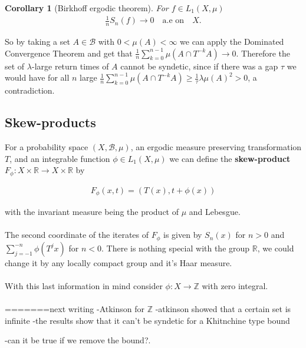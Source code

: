\documentclass{article}
\newtheorem{corollary}{Corollary}[theorem]
\begin{document}
\begin{corollary}[Birkhoff ergodic theorem]
For $f\in L_1(X,\mu)$
\begin{align*}
        \frac{1}{n}S_n(f)\to 0 \quad \text{a.e on} \quad X.
\end{align*}
\end{corollary}

So by taking a set $A\in \mathcal{B}$ with $0<\mu(A)<\infty$ we 
can apply the Dominated Convergence Theorem and get that 
$\frac{1}{n}\sum_{k=0}^{n-1}\mu(A\cap T^{-k} A)\to 0$.
Therefore the set of $\lambda$-large return times of $A$ cannot be syndetic,
since if there was a gap $\tau$ we would have for all $n$ large
$\frac{1}{n}\sum_{k=0}^{n-1}\mu(A\cap T^{-k} A)\geq \frac{1}{\tau}\lambda\mu(A)^2>0$,
a contradiction.

\subsection{Skew-products}

For a probability space $(X,\mathcal{B},\mu)$, an ergodic 
measure preserving transformation $T$, and an integrable
function $\phi\in L_1(X,\mu)$ we can define the \textbf{skew-product}
$F_\phi: X\times \mathbb{R}\to X\times\mathbb{R}$ by 

\begin{align*}
F_\phi(x,t)=(T(x),t+\phi(x))
\end{align*}

with the invariant measure being the product of $\mu$ and Lebesgue.
\paragraph{}

The second coordinate of the iterates of $F_\phi$ is given by 
$S_n(x)$ for $n>0$ and $\sum_{j=-1}^{-n}\phi(T^{j}x)$ for $n<0$.
There is nothing special with the group $\mathbb{R}$, we could 
change it by any locally compact group and it's Haar measure. 

\paragraph{}

With this last information in mind consider $\phi:X\to \mathbb{Z}$
with zero integral. 

\paragraph{}

=======next writing
-Atkinson for $\mathbb{Z}$
-atkinson showed that a certain set is infinite
-the results show that it can't be syndetic for a Khitnchine 
type bound

-can it be true if we remove the bound?.
\end{document}
